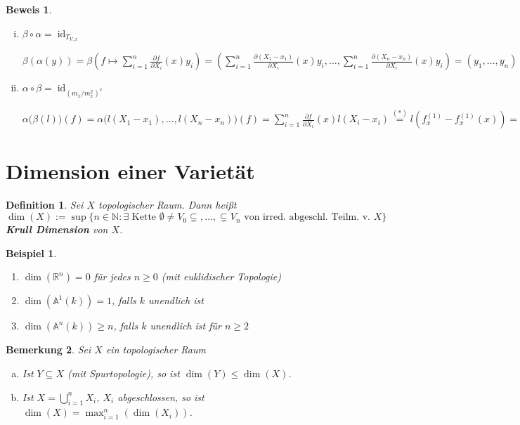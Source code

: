\documentclass[a4paper, 12pt, numbers=noendperiod, chapterprefix=true, headsepline]{scrbook}
\theoremstyle{break}
\newtheorem{Def}{Definition}[section]
\newtheorem{Bem}[Def]{Bemerkung}
\theoremstyle{nonumberbreak}
\newtheorem{nnBsp}{Beispiel}
\newtheorem{Bew}{Beweis}
\theoremstyle{nonumberplain}
\newcommand{\emp}[1]{\textbf{\emph{#1}}}
\newcommand{\defterm}[1]{{\index{#1}}\emp{#1}}
\newcommand{\Sum}{\sum\limits}
\DeclareMathOperator{\id}{id}
\newcommand{\R}{\mathbb{R}}
\newcommand{\N}{\mathbb{N}}
\newcommand{\A}{\mathbb{A}}
\begin{document}
\begin{Bew}
\begin{enumerate}[i)]
	\emph{Behauptung:} $f_x^{(1)}-f_x^{(1)}(x)\in m_x^2$
	
	\emph{denn:} Taylor-Entwicklung $\underbrace{f}_{0\text{ in }k[V]}= \underbrace{f(x)}_{=0\text{, weil }f\in I(V)}+f_x^{(1)}-f_x^{(1)}(x)+ $Terme in $m_x^2$
\item
	$\beta\circ\alpha=\id_{T_{V,x}}$
	
	$\beta(\alpha(y))= \beta(f\mapsto\Sum_{i=1}^n\frac{\partial f}{\partial X_i}(x)y_i) = \left(\Sum_{i=1}^n\frac{\partial(X_1-x_1)}{\partial X_i}(x)y_i,\ldots ,\Sum_{i=1}^n\frac{\partial(X_n-x_n)}{\partial X_i}(x)y_i\right) = (y_1,\ldots ,y_n)$
\item
	$\alpha\circ\beta=\id_{(m_x/m_x^2)^v}$
	
	$\alpha\bigl(\beta(l)\bigr)(f)= \alpha\bigl(l(X_1-x_1),\ldots ,l(X_n-x_n)\bigr)(f) = \Sum_{i=1}^n\frac{\partial f}{\partial X_i}(x)l(X_i-x_i) \overset{(*)}{=} l\left(f_x^{(1)}-f_x^{(1)}(x)\right) = l(\overline f)$
\end{enumerate}\end{Bew}

\newpage


\section{Dimension einer Variet\"at}

\begin{Def}
Sei $X$ topologischer Raum. Dann hei\ss t
	\[\dim(X):=\sup\{n\in\N:\exists\text{ Kette }\emptyset\ne V_0\subsetneq,\ldots ,\subsetneq V_n\text{ von irred. abgeschl. Teilm. v. }X\}\]
\defterm{Krull Dimension} von $X$.
\end{Def}

\begin{nnBsp}\begin{enumerate}[1)]
\item
	$\dim(\R^n)=0$ f\"ur jedes $n\ge0$ (mit euklidischer Topologie)
\item
	$\dim(\A^1(k))=1$, falls $k$ unendlich ist
\item
	$\dim(\A^n(k))\ge n$, falls $k$ unendlich ist f\"ur $n\ge2$
\end{enumerate}\end{nnBsp}

\begin{Bem}\label{bem18.2}
Sei $X$ ein topologischer Raum\begin{enumerate}[a)]
\item
	Ist $Y\subseteq X$ (mit Spurtopologie), so ist $\dim(Y)\le\dim(X)$.
\item\label{bem18.2b}
	Ist $X=\bigcup\limits_{i=1}^nX_i$, $X_i$ abgeschlossen, so ist $\dim(X)=\max_{i=1}^n(\dim(X_i))$.
\end{enumerate}\end{Bem}
\end{document}
